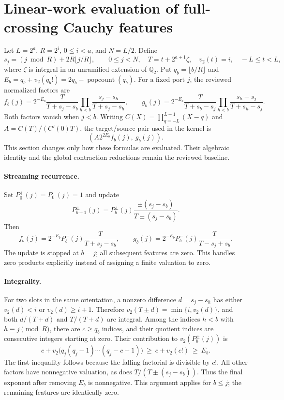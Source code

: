 \section{Linear-work evaluation of full-crossing Cauchy features}
Let $L=2^a$, $R=2^i$, $0\leq i<a$, and $N=L/2$.  Define
\[
 s_j=(j\bmod R)+2R\lfloor j/R\rfloor,\qquad 0\leq j<N,
 \quad T=t+2^{a+1}\zeta,\quad v_2(t)=i,\quad -L\leq t<L,
\]
where $\zeta$ is integral in an unramified extension of $\mathbb Q_2$.
Put $q_b=\lfloor b/R\rfloor$ and
$E_b=q_b+v_2(q_b!)=2q_b-\operatorname{popcount}(q_b)$.
For a fixed port $j$, the reviewed normalized factors are
\[
 f_b(j)=2^{-E_b}\frac{T}{T+s_j-s_b}
          \prod_{h<b}\frac{s_j-s_h}{T+s_j-s_h},\qquad
 g_b(j)=2^{-E_b}\frac{T}{T+s_b-s_j}
          \prod_{h<b}\frac{s_h-s_j}{T+s_h-s_j}.
\]
Both factors vanish when $j<b$.  Writing
$C(X)=\prod_{q=-L}^{L-1}(X-q)$ and
$A=C(T)/(C'(0)T)$, the target/source pair used in the kernel is
\[
 (A2^{2E_b}f_b(j),\ g_b(j)).
\]
This section changes only how these formulas are evaluated. Their algebraic
identity and the global contraction reductions remain the reviewed baseline.

\paragraph{Streaming recurrence.}
Set $P_0^+(j)=P_0^-(j)=1$ and update
\[
 P_{b+1}^{\pm}(j)=P_b^{\pm}(j)
 \frac{\pm(s_j-s_b)}{T\pm(s_j-s_b)}.
\]
Then
\[
 f_b(j)=2^{-E_b}P_b^+(j)\frac{T}{T+s_j-s_b},\qquad
 g_b(j)=2^{-E_b}P_b^-(j)\frac{T}{T-s_j+s_b}.
\]
The update is stopped at $b=j$; all subsequent features are zero.
This handles zero products explicitly instead of assigning a finite valuation
to zero.

\paragraph{Integrality.}
For two slots in the same orientation, a nonzero difference $d=s_j-s_h$
has either $v_2(d)<i$ or $v_2(d)\geq i+1$. Therefore
$v_2(T\pm d)=\min\{i,v_2(d)\}$, and both
$d/(T+d)$ and $T/(T+d)$ are integral.  Among the indices $h<b$ with
$h\equiv j\pmod R$, there are $c\geq q_b$ indices, and their quotient
indices are consecutive integers starting at zero. Their contribution to
$v_2(P_b^\pm(j))$ is
\[
 c+v_2\bigl(q_j(q_j-1)\cdots(q_j-c+1)\bigr)
 \ \geq\ c+v_2(c!)\ \geq\ E_b.
\]
The first inequality follows because the falling factorial is divisible by
$c!$. All other factors have nonnegative valuation, as does
$T/(T\pm(s_j-s_b))$. Thus the final exponent after removing $E_b$ is
nonnegative. This argument applies for $b\leq j$; the remaining features
are identically zero.

